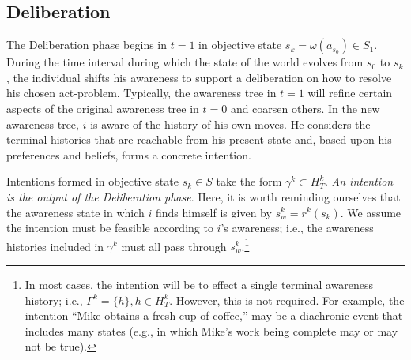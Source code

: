 \documentclass[
11pt,
titlepage,
reqno,
]{article}%
\theoremstyle{definition}
\begin{document}
\subsection{Deliberation}
The Deliberation phase begins in $t=1$ in objective state $s_k=\omega(a_{s_0})\in S_1$.
During the time interval during which the state of the world evolves from  $s_0$ to $s_k$, the individual shifts his awareness to support a deliberation on how to resolve his chosen act-problem. 
Typically, the awareness tree in $t=1$ will refine certain aspects of the original awareness tree in $t=0$ and coarsen others.
In the new awareness tree, $i$ is aware of the history of his own moves.
He considers the terminal histories that are reachable from his present state and, based upon his preferences and beliefs, forms a concrete intention.

Intentions formed in objective state $s_k\in S$ take the form $\gamma^{k}\subset H^k_T$.
\textit{An intention is the output of the Deliberation phase}.
Here, it is worth reminding ourselves that the awareness state in which $i$ finds himself is given by $s^k_w=r^{k}(s_k)$.
We assume the intention must be feasible according to $i$'s awareness; i.e., the awareness histories included in $\gamma^{k}$ must all pass through $s^k_w$.\footnote
{
	In most cases, the intention will be to effect a single terminal awareness history; i.e., $\Gamma^k=\{h\}, h\in H^k_T$. 
	However, this is not required. 
	For example, the intention ``Mike obtains a fresh cup of coffee,'' may be a diachronic event that includes many states (e.g., in which Mike's work being complete may or may not be true).
}
 
\end{document}
